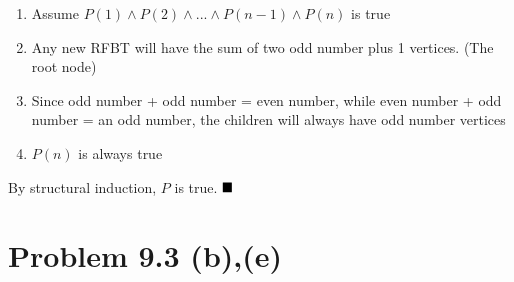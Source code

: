 \documentclass{article}
\def\math#1{$#1$}
\begin{document}
\begin{enumerate}[(a)]
\begin{itemize}
                \begin{enumerate}
                    \item Assume \math{P(1)\land P(2)\land...\land P(n-1)\land P(n)} is true
                    \item Any new RFBT will have the sum of two odd number plus 1 vertices. (The root node)
                    \item Since odd number + odd number = even number, while even number + odd number = an odd number, the children will always have odd number vertices
                    \item \math{P(n)} is always true
                \end{enumerate}
        \end{itemize}
        
    By structural induction, \math{P} is true. \math{\hfill{\blacksquare}}
\end{enumerate}

\section{Problem 9.3 (b),(e)}
\end{document}
